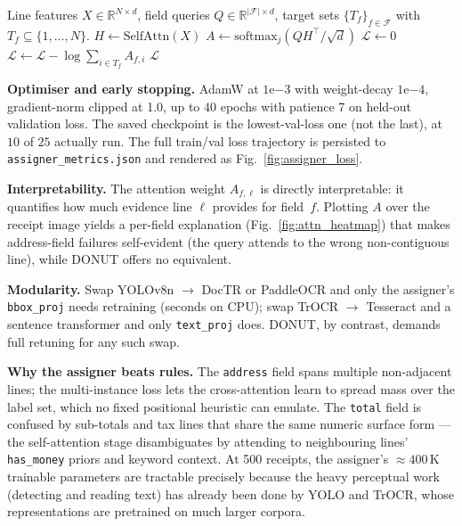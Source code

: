 \documentclass[conference]{IEEEtran}
\begin{document}
\begin{algorithm}[t]
\caption{Multi-instance pos-mass NLL (one receipt).}
\label{alg:posmass}
\begin{algorithmic}[1]
\Require Line features $X \in \mathbb{R}^{N\times d}$, field queries
         $Q \in \mathbb{R}^{|\mathcal{F}|\times d}$, target sets
         $\{T_f\}_{f\in\mathcal{F}}$ with $T_f \subseteq \{1,\dots,N\}$.
\State $H \leftarrow \mathrm{SelfAttn}(X)$ 
\State $A \leftarrow \mathrm{softmax}_j(Q H^\top / \sqrt{d})$ 
\State $\mathcal{L} \leftarrow 0$
  \State $\mathcal{L} \leftarrow \mathcal{L} - \log \sum_{i \in T_f} A_{f,i}$
\EndFor
\State \Return $\mathcal{L}$
\end{algorithmic}
\end{algorithm}

\textbf{Optimiser and early stopping.}
AdamW at $1\mathrm{e}{-3}$ with weight-decay $1\mathrm{e}{-4}$,
gradient-norm clipped at 1.0, up to $40$ epochs with
patience 7 on held-out validation loss.  The saved checkpoint is the
lowest-val-loss one (not the last), at
$10$ of $25$ actually run.
The full train/val loss trajectory is persisted to
\texttt{assigner\_metrics.json} and rendered as
Fig.~\ref{fig:assigner_loss}.

\textbf{Interpretability.}
The attention weight $A_{f,\ell}$ is directly interpretable:
it quantifies how much evidence line $\ell$ provides for field~$f$.
Plotting $A$ over the receipt image yields a per-field explanation
(Fig.~\ref{fig:attn_heatmap}) that makes address-field failures
self-evident (the query attends to the wrong non-contiguous line),
while DONUT offers no equivalent.

\textbf{Modularity.}
Swap YOLOv8n $\to$ DocTR or PaddleOCR and only the assigner's
\texttt{bbox\_proj} needs retraining (seconds on CPU); swap
TrOCR $\to$ Tesseract and a sentence transformer and only
\texttt{text\_proj} does.  DONUT, by contrast, demands full retuning
for any such swap.

\textbf{Why the assigner beats rules.}
The \texttt{address} field spans multiple non-adjacent lines; the
multi-instance loss lets the cross-attention learn to spread mass
over the label set, which no fixed positional heuristic can emulate.
The \texttt{total} field is confused by sub-totals and tax lines that
share the same numeric surface form --- the self-attention stage
disambiguates by attending to neighbouring lines' \texttt{has\_money}
priors and keyword context.  At 500 receipts, the assigner's
$\approx400$\,K trainable parameters are
tractable precisely because the heavy perceptual work (detecting and
reading text) has already been done by YOLO and TrOCR, whose
representations are pretrained on much larger corpora.
\end{document}
